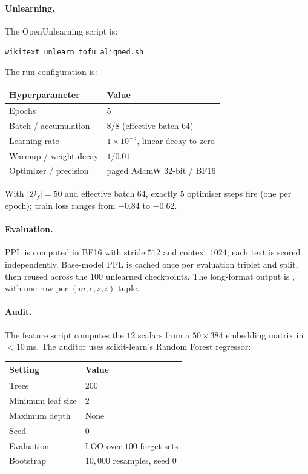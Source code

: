 \documentclass[11pt,a4paper]{article}
\newcommand{\Df}{\mathcal{D}_f}
\begin{document}
\paragraph{Unlearning.} The OpenUnlearning script is:
\begin{center}
\footnotesize
\texttt{wikitext\_unlearn\_tofu\_aligned.sh}
\end{center}
The run configuration is:
\begin{center}
\footnotesize
\begin{tabular}{@{}ll@{}}
    \toprule
    Hyperparameter & Value \\
    \midrule
    Epochs & $5$ \\
    Batch / accumulation & $8 / 8$ (effective batch $64$) \\
    Learning rate & $1\!\times\!10^{-5}$, linear decay to zero \\
    Warmup / weight decay & $1 / 0.01$ \\
    Optimizer / precision & paged AdamW 32-bit / BF16 \\
    \bottomrule
\end{tabular}
\end{center}
With $|\Df|{=}50$ and effective batch $64$, exactly $5$ optimiser steps fire
(one per epoch); train loss ranges from $-0.84$ to $-0.62$.

\paragraph{Evaluation.} PPL is computed in BF16 with stride $512$ and context
$1024$; each text is scored independently. Base-model PPL is cached once per
evaluation triplet and split, then reused across the $100$ unlearned
checkpoints. The long-format output is , with one row
per $(m,e,s,i)$ tuple.

\paragraph{Audit.} The feature script  computes
the $12$ scalars from a $50\!\times\!384$ embedding matrix in $<\!10$\,ms. The
auditor uses scikit-learn's Random Forest regressor:
\begin{center}
\footnotesize
\begin{tabular}{@{}ll@{}}
    \toprule
    Setting & Value \\
    \midrule
    Trees & $200$ \\
    Minimum leaf size & $2$ \\
    Maximum depth & None \\
    Seed & $0$ \\
    Evaluation & LOO over $100$ forget sets \\
    Bootstrap & $10{,}000$ resamples, seed $0$ \\
    \bottomrule
\end{tabular}
\end{center}
\end{document}
